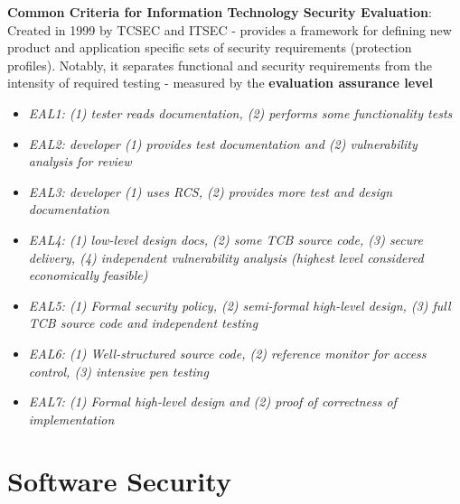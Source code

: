 \documentclass{article}
\begin{document}
\noindent
\textbf{Common Criteria for Information Technology Security Evaluation}: Created in 1999 by TCSEC and ITSEC  - provides a framework for defining new product and application specific sets of security requirements (protection profiles). Notably, it separates functional and security requirements from the intensity of required testing - measured by the \textbf{evaluation assurance level}
\begin{itemize}
	\item \textit{EAL1: (1) tester reads documentation, (2) performs some functionality tests}
	\item \textit{EAL2: developer (1) provides test documentation and (2) vulnerability analysis for review}
	\item \textit{EAL3: developer (1) uses RCS, (2) provides more test and design documentation}
	\item \textit{EAL4: (1) low-level design docs, (2) some TCB source code, (3) secure delivery, (4)  independent vulnerability analysis (highest level considered economically feasible)}
	\item \textit{EAL5: (1) Formal security policy, (2) semi-formal high-level design, (3) full TCB source code and independent testing}
	\item \textit{EAL6: (1) Well-structured source code, (2) reference monitor for access control, (3) intensive pen testing}
	\item \textit{EAL7: (1) Formal high-level design and (2) proof of correctness of implementation}

\end{itemize}

\section{Software Security}
\end{document}
